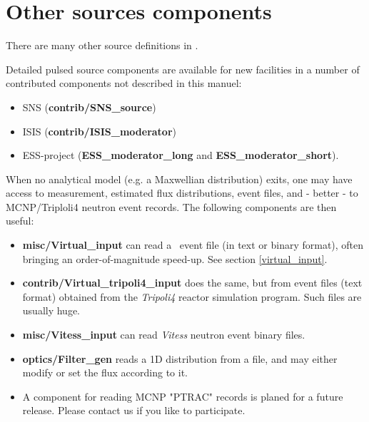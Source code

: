 \newpage


\newpage


\newpage


\newpage


\newpage


\newpage


\newpage


\newpage


\newpage
\section{Other sources components}
\label{sources-seealso}

There are many other source definitions in \MCS .

Detailed pulsed source components are available for new facilities
in a number of contributed components not described in this manuel:
\begin{itemize}
\item SNS ({\bf contrib/SNS\_source})
\item ISIS ({\bf contrib/ISIS\_moderator})
\item ESS-project ({\bf ESS\_moderator\_long} and {\bf  ESS\_moderator\_short}).
\end{itemize}

When no analytical model (e.g. a Maxwellian distribution) exits, 
one may have access to measurement, estimated flux distributions, 
event files, and - better - to MCNP/Triploli4 neutron event records. 
The following components are then useful:

\begin{itemize}
\item{{\bf misc/Virtual\_input} can read a \MCS\ event file 
(in text or binary format), often bringing an order-of-magnitude speed-up. 
See section \ref{virtual_input}.}
\item{{\bf contrib/Virtual\_tripoli4\_input} does the same, but from event files (text format) obtained from the \emph{Tripoli4} \cite{tripoli_webpage} reactor simulation program. Such files are usually huge.}
\item{{\bf misc/Vitess\_input} can read \emph{Vitess} \cite{vitess_webpage} neutron event binary files.}
\item{{\bf optics/Filter\_gen} reads a 1D distribution from a file, and may either modify or set the flux according to it.}
\item{A component for reading MCNP "PTRAC" records is planed for a future release. 
Please contact us if you like to participate.}
\end{itemize}
